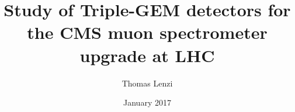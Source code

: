 \title{Study of Triple-GEM detectors for the CMS muon spectrometer upgrade at LHC}
\author{Thomas Lenzi}
\date{January 2017}
\maketitle
